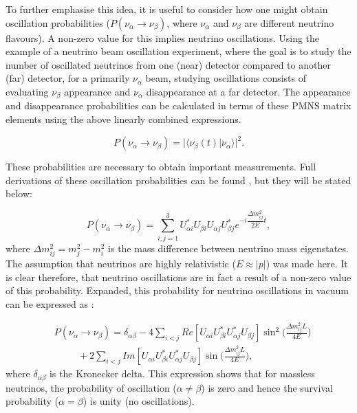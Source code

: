 \documentclass[11pt]{article}
\newcommand{\ket}[1]{\lvert #1 \rangle}
\newcommand{\bra}[1]{\langle #1 \rvert}
\begin{document}
To further emphasise this idea, it is useful to consider how one might obtain oscillation probabilities ($P(\nu_{\alpha}\xrightarrow{}\nu_{\beta})$, where $\nu_{\alpha}$ and $\nu_{\beta}$ are different neutrino flavours). A non-zero value for this implies neutrino oscillations. Using the example of a neutrino beam oscillation experiment, where the goal is to study the number of oscillated neutrinos from one (near) detector compared to another (far) detector, for a primarily $\nu_{\alpha}$ beam, studying oscillations consists of evaluating $\nu_{\beta}$ appearance and $\nu_{\alpha}$ disappearance at a far detector. The appearance and disappearance probabilities can be calculated in terms of these PMNS matrix elements using the above linearly combined expressions. 

\begin{equation}
    P(\nu_{\alpha}\xrightarrow{}\nu_{\beta}) = |\bra{\nu_{\beta}(t)\ket{\nu_{\alpha}}}^2.
\end{equation}

These probabilities are necessary to obtain important measurements. Full derivations of these oscillation probabilities can be found \cite{suekane, Cremonesi, Derek, Thomson}, but they will be stated below:

\begin{equation}
    P(\nu_{\alpha} \xrightarrow{}\nu_{\beta}) = \sum_{i,j=1}^3 U_{\alpha i}^*U_{\beta i}U_{\alpha j}U_{\beta j}^*e^{-i\dfrac{\Delta m^2_{ij}}{2E}t},
\end{equation}
where $\Delta m^2_{ij} = m_j^2 - m_i^2$ is the mass difference between neutrino mass eigenstates. The assumption that neutrinos are highly relativistic ($E\approx |p|$) was made here. It is clear therefore, that neutrino oscillations are in fact a result of a non-zero value of this probability. Expanded, this probability for neutrino oscillations in vacuum can be expressed as \cite{Derek}:

\begin{equation}
\begin{split}
& P(\nu_{\alpha} \xrightarrow{}\nu_{\beta}) = \delta_{\alpha \beta} - 4 \sum_{i<j} Re[U_{\alpha i}U_{\beta i}^*U_{\alpha j}^*U_{\beta j}]\sin^2\bigg(\frac{\Delta m^2_{ij}L}{4E}\bigg) \\
&\phantom{+} \phantom{+} + 2 \sum_{i<j}Im[U_{\alpha i}U_{\beta i}^*U_{\alpha j}^*U_{\beta j}]\sin\bigg(\frac{\Delta m^2_{ij}L}{4E}\bigg),
\end{split}
\end{equation}
where $\delta_{\alpha \beta}$ is the Kronecker delta. This expression shows that for massless neutrinos, the probability of oscillation ($\alpha \neq \beta$) is zero and hence the survival probability ($\alpha = \beta$) is unity (no oscillations).
\end{document}
